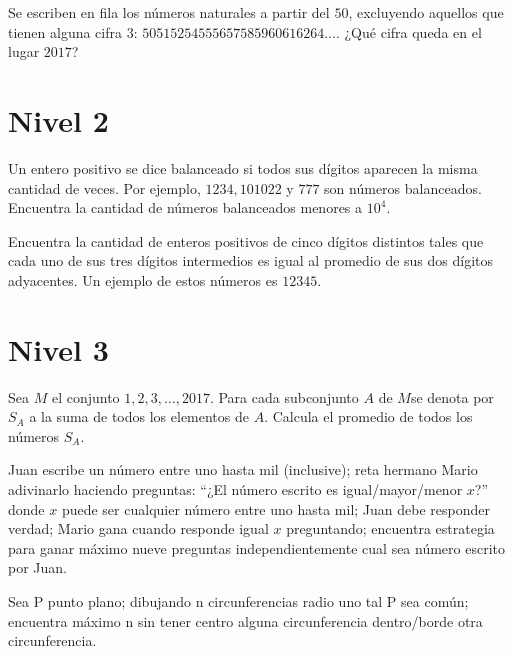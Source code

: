 \begin{problem}[OMMEB 2017]
    Se escriben en fila los números naturales a partir del 
    \(50\), excluyendo aquellos que tienen alguna cifra \(3\): 
    \(50515254555657585960616264 \ldots\). 
    ¿Qué cifra queda en el lugar \(2017\)?
\end{problem}

\section{Nivel 2}

\begin{problem}[OMMEB 2017]
    Un entero positivo se dice balanceado si todos sus dígitos 
    aparecen la misma cantidad de veces. Por ejemplo,
    \(1234, 101022\) y \(777\) son números balanceados. 
    Encuentra la cantidad de números balanceados menores a 
    \(10^4\).
\end{problem}

\begin{problem}[OMMEB 2017]
    Encuentra la cantidad de enteros positivos de cinco dígitos 
    distintos tales que cada uno de sus tres dígitos intermedios 
    es igual al promedio de sus dos dígitos adyacentes. 
    Un ejemplo de estos números es \(12345\).
\end{problem}

\section{Nivel 3}

\begin{problem}[OMMEB 2017]
    Sea $M$ el conjunto \(1, 2, 3, \ldots , 2017\). Para cada 
    subconjunto $A$ de $M $se denota por $S_A$ a la suma de 
    todos los elementos de $A$. Calcula el promedio de todos 
    los números $S_A$.
\end{problem}

\begin{dproblem}[OMMEB 2017]
    Juan escribe un número entre uno hasta mil (inclusive); 
    reta hermano Mario adivinarlo haciendo preguntas: 
    “¿El número escrito es igual/mayor/menor $x$?” donde $x$ 
    puede ser cualquier número entre uno hasta mil; Juan debe 
    responder verdad; Mario gana cuando responde igual $x$ 
    preguntando; encuentra estrategia para ganar máximo nueve 
    preguntas independientemente cual sea número escrito por Juan.
\end{dproblem}

\begin{problem}[OMMEB 2017]
    Sea P punto plano; dibujando n circunferencias radio uno tal P 
    sea común; encuentra máximo n sin tener centro alguna 
    circunferencia dentro/borde otra circunferencia.
\end{problem}


